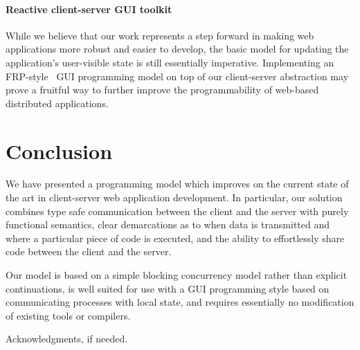 \documentclass[preprint]{sigplanconf}
\begin{document}
\paragraph{Reactive client-server GUI toolkit} While we believe that our work
represents a step forward in making web applications more robust and easier to
develop, the basic model for updating the application's user-visible state is
still essentially imperative. Implementing an FRP-style\ \cite{ppfrp} GUI
programming model on top of our client-server abstraction may prove a fruitful
way to further improve the programmability of web-based distributed
applications.

\section{Conclusion}

We have presented a programming model which improves on the current state of
the art in client-server web application development. In particular, our
solution combines type safe communication between the client and the server
with purely functional semantics, clear demarcations as to when data is
transmitted and where a particular piece of code is executed, and the ability to
effortlessly share code between the client and the server.

Our model is based on a simple blocking concurrency model rather than explicit
continuations, is well suited for use with a GUI programming style based on
communicating processes with local state, and requires essentially no
modification of existing tools or compilers.

\acks

Acknowledgments, if needed.




\end{document}
